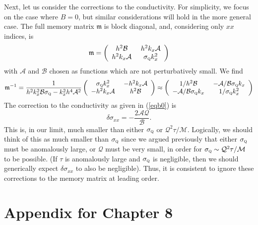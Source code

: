 \documentclass[10pt, oneside]{book}
\begin{document}
\begin{doublespace}
\begin{appendix}
Next, let us consider the corrections to the conductivity.   For simplicity, we focus on the case where $B=0$, but similar considerations will hold in the more general case. The full memory matrix $\mathfrak{m}$ is block diagonal, and, considering only $xx$ indices, is \begin{equation}
\mathfrak{m} = \left(\begin{array}{cc} h^2 \mathcal{B}  &\   h^2k_x \mathcal{A} \\ h^2 k_x \mathcal{A} &\  \sigma_{\textsc{q}}k_x^2 \end{array}\right)
\end{equation}
with $\mathcal{A}$ and $\mathcal{B}$ chosen as functions which are not perturbatively small.    We find \begin{equation}
\mathfrak{m}^{-1} = \frac{1}{h^2k_x^2\mathcal{B}\sigma_{\textsc{q}}-k_x^2h^4\mathcal{A}^2} \left(\begin{array}{cc} \sigma_{\textsc{q}}k_x^2 &\   -h^2k_x \mathcal{A} \\ -h^2 k_x \mathcal{A} &\ h^2 \mathcal{B}  \end{array}\right) \approx \left(\begin{array}{cc} 1/h^2\mathcal{B} &\   - \mathcal{A}/\mathcal{B}\sigma_{\textsc{q}}k_x \\ - \mathcal{A}/\mathcal{B}\sigma_{\textsc{q}}k_x &\ 1/\sigma_{\textsc{q}}k_x^2  \end{array}\right)
\end{equation}The correction to the conductivity as given in (\ref{eqb0}) is \begin{equation}
\delta \sigma_{xx} = -\frac{2\mathcal{AQ}}{\mathcal{B}}.
\end{equation}
This is, in our limit, much smaller than either $\sigma_{\textsc{q}}$ or $\mathcal{Q}^2\tau/\mathcal{M}$.   Logically, we should think of this as much smaller than $\sigma_{\textsc{q}}$ since we argued previously that either $\sigma_{\textsc{q}}$ must be anomalously large, or $\mathcal{Q}$ must be very small, in order for $\sigma_{\textsc{q}} \sim \mathcal{Q}^2\tau/\mathcal{M}$ to be possible.   (If $\tau$ is anomalously large and $\sigma_{\textsc{q}}$ is negligible, then we should generically expect $\delta \sigma_{xx}$ to also be negligible).    Thus, it is consistent to ignore these corrections to the memory matrix at leading order.

\chapter{Appendix for Chapter 8}



\end{appendix}
\end{doublespace}
\end{document}

